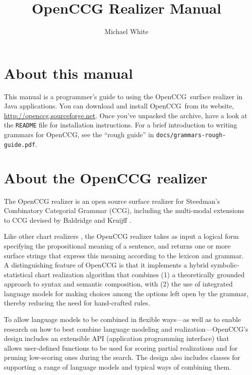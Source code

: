 \documentclass[11pt]{article}
\title{OpenCCG Realizer Manual}
\author{Michael White}
\newcommand{\occg}{OpenCCG}
\begin{document}
\thispagestyle{empty}
\maketitle
\tableofcontents
\listoffigures
\newpage



\section{About this manual}

This manual is a programmer's guide to using the \occg\ surface realizer
in Java applications. You can download and install \occg\ from its
website, \url{http://openccg.sourceforge.net}. Once you've unpacked the
archive, have a look at the \texttt{README} file for installation
instructions. For a brief introduction to writing grammars for \occg,
see the ``rough guide'' in \texttt{docs/grammars-rough-guide.pdf}.


\section{About the OpenCCG realizer}
\label{overview}

The OpenCCG realizer
\cite{White/Baldridge:2003,White-RLAC:2004,White-INLG:2004,White-ACLSoft:2005}
is an open source surface realizer for Steedman's
\cite{Steedman-LI:2000,Steedman:SynProc} Combinatory Categorial Grammar
(CCG), including the multi-modal extensions to CCG devised by Baldridge
and Kruijff \cite{Baldridge:PhD,Baldridge/Kruijff:2003}.

Like other chart realizers
\cite{Kay:1996,Shemtov:PhD,Carroll-and-co:1999,Bob-Moore:2002}, the
OpenCCG realizer takes as input a logical form specifying the
propositional meaning of a sentence, and returns one or more surface
strings that express this meaning according to the lexicon and grammar.
A distinguishing feature of OpenCCG is that it implements a hybrid
symbolic-statistical chart realization algorithm that combines (1) a
theoretically grounded approach to syntax and semantic composition, with
(2) the use of integrated language models for making choices among the
options left open by the grammar, thereby reducing the need for
hand-crafted rules.

To allow language models to be combined in flexible ways---as well as to
enable research on how to best combine language modeling and
realization---OpenCCG's design includes an extensible API (application
programming interface) that allows user-defined functions to be used for
scoring partial realizations and for pruning low-scoring ones during the
search. The design also includes classes for supporting a range of
language models and typical ways of combining them.
\end{document}
